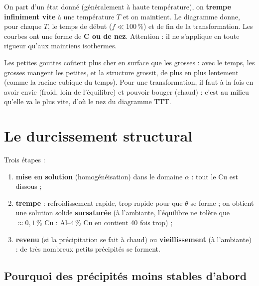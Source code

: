 \begin{defnbox}[title={Diagramme TTT (Temps--Température--Transformation)}]
On part d'un état donné (généralement à haute température), on \textbf{trempe infiniment vite}
à une température $T$ et on maintient. Le diagramme donne, pour chaque $T$, le temps de début
($f \ll 100\,\%$) et de fin de la transformation. Les courbes ont une forme de \textbf{\og C\fg{}
ou de nez}. Attention : il ne s'applique en toute rigueur qu'aux maintiens isothermes.
\end{defnbox}

\begin{goatbox}
Les petites gouttes coûtent plus cher en surface que les grosses : avec le temps, les grosses
mangent les petites, et la structure grossit, de plus en plus lentement (comme la racine
cubique du temps). Pour une transformation, il faut à la fois en avoir envie (froid, loin de
l'équilibre) et pouvoir bouger (chaud) : c'est au milieu qu'elle va le plus vite, d'où le nez
du diagramme TTT.
\end{goatbox}

\section{Le durcissement structural}

\begin{defnbox}[title={Durcissement structural (\emph{precipitation} ou \emph{age hardening})}]
Trois étapes :
\begin{enumerate}
  \item \textbf{mise en solution} (homogénéisation) dans le domaine $\alpha$ : tout le Cu est dissous ;
  \item \textbf{trempe} : refroidissement rapide, trop rapide pour que $\theta$ se forme ; on
        obtient une solution solide \textbf{sursaturée} (à l'ambiante, l'équilibre ne tolère que
        $\approx 0{,}1\,\%$ Cu : Al--4\,\% Cu en contient 40 fois trop) ;
  \item \textbf{revenu} (si la précipitation se fait à chaud) ou \textbf{vieillissement} (à
        l'ambiante) : de très nombreux petits précipités se forment.
\end{enumerate}
\end{defnbox}


\subsection*{Pourquoi des précipités \og moins stables\fg{} d'abord}

